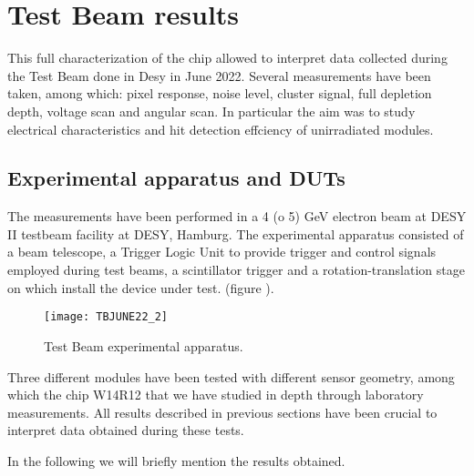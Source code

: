 \section{Test Beam results}

This full characterization of the chip allowed to interpret data collected during the Test Beam done in Desy in June 2022. Several measurements have been taken, among which: pixel response, noise level, cluster signal, full depletion depth, voltage scan and angular scan. In particular the aim was to study electrical characteristics and hit detection effciency of unirradiated modules.



\subsection{Experimental apparatus and DUTs }

The measurements have been performed in a 4 (o 5) GeV electron beam at DESY II testbeam facility at DESY, Hamburg. The experimental apparatus consisted of a beam telescope, a Trigger Logic Unit to provide trigger and control signals employed during test beams, a scintillator trigger and a rotation-translation stage on which install the device under test. (figure ).

\begin{figure}[h!]
\centering
\texttt{[image: TBJUNE22\_2]}
\caption{Test Beam experimental apparatus.}
\label{fig:tb}
\end{figure}



\begin{comment}
\begin{figure}[h!]
\centering
\subfigure[Test beam apparatus.]
{\texttt{[image: TBJUNE22\_PHOTO]}}\quad
\subfigure[Test beam schematics.]
{\texttt{[image: TBJUNE22]}}\\
\caption{Test Beam setting at DESY.}
\label{fig:tb}
\end{figure}
\end{comment}

Three different modules have been tested with different sensor geometry, among which the chip W14R12 that we have studied in depth through laboratory measurements. All results described in previous sections have been crucial to interpret data obtained during these tests.

In the following we will briefly mention the results obtained.


